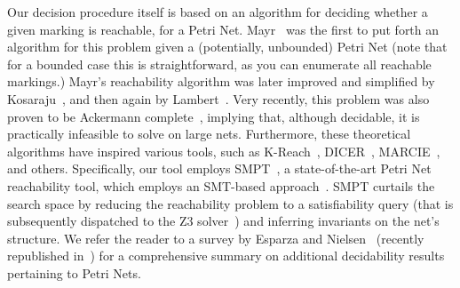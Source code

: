 Our decision procedure itself is based on an algorithm for deciding whether a given marking is reachable, for a Petri Net.
%
Mayr~\cite{Ma81} was the first to put forth an algorithm for this problem given a (potentially, unbounded) Petri Net (note that for a bounded case this is straightforward, as you can enumerate all reachable markings.)
%
Mayr's reachability algorithm was later improved and simplified by Kosaraju~\cite{Ko82}, and then again by Lambert~\cite{La92}.
%
Very recently, this problem was also proven to be Ackermann complete~\cite{CzWo22}, implying that, although decidable, it is practically infeasible to solve on large nets.
%
Furthermore, these theoretical algorithms have inspired various tools, such as K-Reach~\cite{DiLa20}, DICER~\cite{XiZhLi21}, MARCIE~\cite{HeRoSc13}, and others. 
%
Specifically, our tool employs SMPT~\cite{AmDa23}, a state-of-the-art Petri Net reachability tool, which employs an SMT-based approach~\cite{AmBeDa21, AmDaHu22}. SMPT curtails the search space by reducing the reachability problem to a satisfiability query (that is subsequently dispatched to the Z3 solver~\cite{DeBj08}) and inferring invariants on the net's structure.
%
We refer the reader to a survey by Esparza and Nielsen~\cite{EsNi94} (recently republished in~\cite{EsNi24}) for a comprehensive summary on additional decidability results pertaining to Petri Nets.
 

